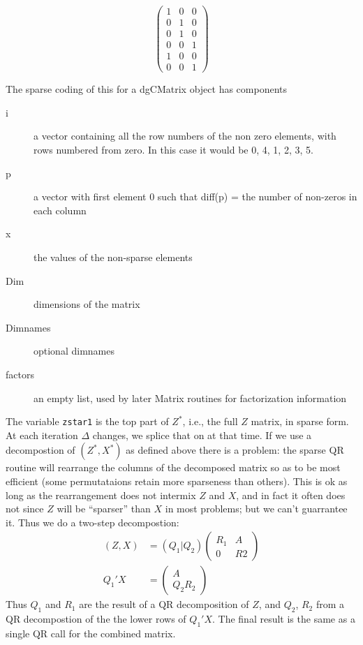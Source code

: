 \documentclass{article}
\begin{document}
\begin{equation*}
  \left( \begin{array}{cccccc}
    1&0&0 \\ 0&1&0 \\ 0&1&0 \\
    0&0&1 \\ 1&0&0 \\0&0&1 \end{array} \right)
\end{equation*}

The sparse coding of this for a dgCMatrix object has 
components
\begin{description}
  \item[i] a vector containing all the row numbers of the non zero
    elements, with rows numbered from zero.
    In this case it would be 0, 4, 1, 2, 3, 5.
  \item[p] a vector with first element 0 such that diff(p) = the
    number of non-zeros in each column
  \item[x] the values of the non-sparse elements
  \item[Dim] dimensions of the matrix
  \item[Dimnames] optional dimnames
  \item[factors] an empty list, used by later Matrix routines for
    factorization information
\end{description}

The variable {\tt{}zstar1} is the top part of $Z^*$, i.e., the full $Z$
matrix, in sparse form.  
At each iteration $\Delta$ changes, we splice that on at that time.
If we use a decompostion of $(Z^*, X^*)$ as defined above there
is a problem: the sparse QR routine will rearrange the columns of
the decomposed matrix so as to be most efficient (some permutataions
retain more sparseness than others). 
This is ok as long as the rearrangement does not intermix $Z$ and
$X$, and in fact it often does not since $Z$ will be ``sparser'' than $X$ 
in most problems; but we can't guarrantee it.                  %
Thus we do a two-step decompostion:
\begin{align*}
  (Z,X) &= (Q_1 | Q_2) \left(\begin{array}{cc} R_1 & A\\ 0 & R2 
                       \end{array} \right) \\
    Q_1'X &= \left ( \begin{array}{c} A\\ Q_2R_2 \end{array} \right)
\end{align*}
Thus $Q_1$ and $R_1$ are the result of a QR decomposition of $Z$,
and $Q_2$, $R_2$ from a QR decompostion of the
the lower rows of $Q_1'X$.
The final result is the same as a single QR call for the combined
matrix.
\end{document}
